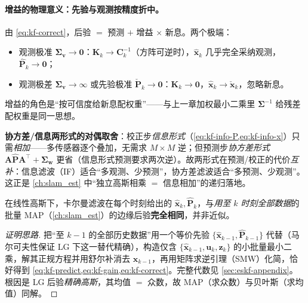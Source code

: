 \paragraph{增益的物理意义：先验与观测按精度折中。}
由 \cref{eq:kf-correct}，后验 $=$ 预测 $+$ 增益 $\times$ 新息。两个极端：
\begin{itemize}
  \item 观测极准 $\boldsymbol{\Sigma}_{\mathbf{v}}\to\mathbf{0}$：$\mathbf{K}_k\to\mathbf{C}_k^{-1}$（方阵可逆时），$\hat{\mathbf{x}}_k$ 几乎完全采纳观测，$\hat{\mathbf{P}}_k\to\mathbf{0}$；
  \item 观测极差 $\boldsymbol{\Sigma}_{\mathbf{v}}\to\infty$ 或先验极准 $\check{\mathbf{P}}_k\to\mathbf{0}$：$\mathbf{K}_k\to\mathbf{0}$，$\hat{\mathbf{x}}_k\to\check{\mathbf{x}}_k$，忽略新息。
\end{itemize}
增益的角色是“按可信度给新息配权重”——与上一章加权最小二乘里 $\boldsymbol{\Sigma}^{-1}$ 给残差配权重是同一思想\cite{barfoot2024state}。

\begin{insight}
\textbf{协方差/信息两形式的对偶取舍}：校正步\emph{信息形式}（\cref{eq:kf-info-P,eq:kf-info-x}）只需\emph{相加}——多传感器逐个叠加，无需求 $M\times M$ 逆；但预测步\emph{协方差形式} $\mathbf{A}\hat{\mathbf{P}}\mathbf{A}^\top+\boldsymbol{\Sigma}_{\mathbf{w}}$ 更省（信息形式预测要求两次逆）。故两形式在预测/校正的代价\emph{互补}：信息滤波（IF）适合“多观测、少预测”，协方差滤波适合“多预测、少观测”。这正是 \cref{ch:slam_est} 中“独立高斯相乘 $=$ 信息相加”的递归落地。
\end{insight}

\begin{theorem}\label{thm:kf-map}
在线性高斯下，卡尔曼滤波在每个时刻给出的 $\hat{\mathbf{x}}_k,\hat{\mathbf{P}}_k$，与\emph{用至 $k$ 时刻全部数据}的批量 MAP（\cref{ch:slam_est}）的边缘后验\textbf{完全相同}，并非近似。
\end{theorem}
\begin{proof}[证明思路]
把“至 $k-1$ 的全部历史数据”用一个等价先验 $\{\hat{\mathbf{x}}_{k-1},\hat{\mathbf{P}}_{k-1}\}$ 代替（马尔可夫性保证 LG 下这一替代精确），构造仅含 $\{\hat{\mathbf{x}}_{k-1},\mathbf{u}_k,\mathbf{z}_k\}$ 的小批量最小二乘，解其正规方程并用舒尔补消去 $\mathbf{x}_{k-1}$，再用矩阵求逆引理（SMW）化简，恰好得到 \cref{eq:kf-predict,eq:kf-gain,eq:kf-correct}。完整代数见 \cref{sec:eskf-appendix}。根因是 LG 后验\emph{精确高斯}，其均值 $=$ 众数，故 MAP（求众数）与贝叶斯（求均值）同解。
\end{proof}

